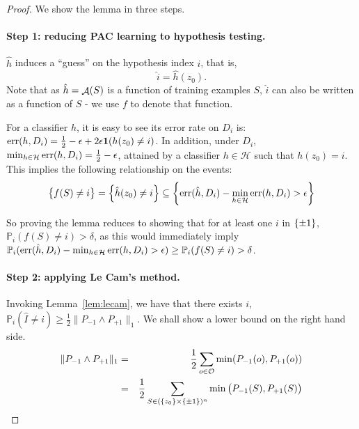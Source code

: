 \documentclass{article}
\DeclareMathOperator*{\err}{{\rm err}}
\DeclareMathOperator*{\Acal}{{\cal A}}
\newcommand{\PP}{\mathbb{P}}
\newcommand{\Hcal}{\mathcal{H}}
\newcommand{\Ocal}{\mathcal{O}}
\newcommand*{\one}{{\bf 1}}
\begin{document}
\begin{proof}
We show the lemma in three steps.

\paragraph{Step 1: reducing PAC learning to hypothesis testing.}
$\hat{h}$ induces a ``guess'' on the hypothesis index $i$, that is,
\[ \hat{i} = \hat{h}(z_0). \]
Note that as $\hat{h} = \Acal(S)$ is a function of training examples $S$, $\hat{i}$
can also be written as a function of $S$ - we use $f$ to denote that function.

For a classifier $h$, it is easy to see its error rate on $D_i$ is:
$\err(h, D_i) = \frac12 - \epsilon + 2\epsilon \one(h(z_0) \neq i)$. In addition,
under $D_i$, $\min_{h \in \Hcal} \err(h, D_i) = \frac12 - \epsilon$, attained by a classifier
$h \in \Hcal$ such that $h(z_0) = i$. This implies the following relationship on the events:
\[ \cbr{f(S) \neq i} = \cbr{\hat{h}(z_0) \neq i} \subseteq \cbr{\err(\hat{h}, D_i) - \min_{h \in \Hcal} \err(h, D_i) > \epsilon} \]


So proving the lemma reduces to showing that for at least one $i$ in $\cbr{\pm 1}$, $\PP_i(f(S) \neq i) > \delta$, as this would immediately imply $\PP_i(\err(\hat{h}, D_i) - \min_{h \in \Hcal} \err(h, D_i) > \epsilon) \geq \PP_i(f(S) \neq i) > \delta$.


\paragraph{Step 2: applying Le Cam's method.}
Invoking Lemma~\ref{lem:lecam}, we have that there exists $i$, $\PP_i(\hat{I} \neq i) \geq \frac12 \|P_{-1} \wedge P_{+1}\|_1$. We shall show a lower bound on the right hand side.
\begin{eqnarray}
 \|P_{-1} \wedge P_{+1}\|_1
  &=& \frac12\sum_{o \in \Ocal} \min(P_{-1}(o), P_{+1}(o)) \nonumber \\
  &=& \frac12\sum_{S \in (\cbr{z_0} \times \cbr{\pm 1})^n} \min\del{P_{-1}(S), P_{+1}(S)}
  \label{eqn:explicit-tv}
\end{eqnarray}

\end{proof}
\end{document}
